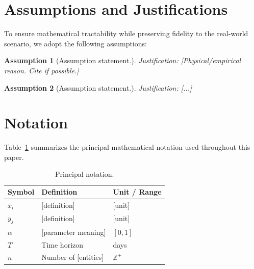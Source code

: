 \documentclass{mcmthesis}
\newtheorem{assumption}{Assumption}
\begin{document}
\section{Assumptions and Justifications}

To ensure mathematical tractability while preserving fidelity to the real-world scenario, we adopt the following assumptions:

\begin{assumption}
    [Assumption statement.]
    \textit{Justification:} [Physical/empirical reason. Cite if possible.]
\end{assumption}

\begin{assumption}
    [Assumption statement.]
    \textit{Justification:} [...]
\end{assumption}


\section{Notation}

Table~\ref{tab:notation} summarizes the principal mathematical notation used throughout this paper.

\begin{table}[H]
\centering
\caption{Principal notation.}
\label{tab:notation}
\begin{tabular}{p{2.2cm} p{7cm} p{2.5cm}}
\toprule
\textbf{Symbol} & \textbf{Definition} & \textbf{Unit / Range} \\
\midrule
$x_i$       & [definition]          & [unit] \\
$y_j$       & [definition]          & [unit] \\
$\alpha$    & [parameter meaning]   & $[0, 1]$ \\
$T$         & Time horizon          & days \\
$n$         & Number of [entities]  & $\mathbb{Z}^+$ \\
\bottomrule
\end{tabular}
\end{table}
\end{document}
